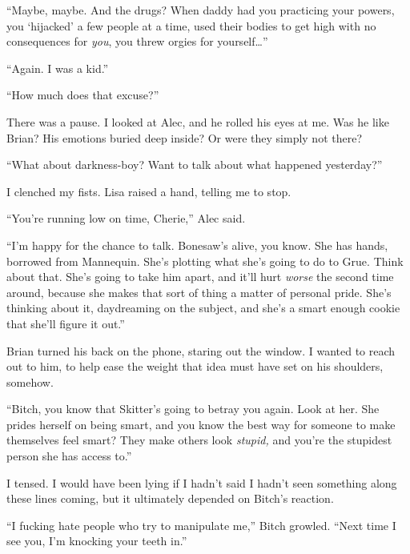 ``Maybe, maybe.  And the drugs?  When daddy had you practicing your powers, you `hijacked' a few people at a time, used their bodies to get high with no consequences for \emph{you}, you threw orgies for yourself\ldots''



``Again.  I was a kid.''



``How much does that excuse?''



There was a pause.  I looked at Alec, and he rolled his eyes at me.  Was he like Brian?  His emotions buried deep inside?  Or were they simply not there?



``What about darkness-boy?  Want to talk about what happened yesterday?''



I clenched my fists.  Lisa raised a hand, telling me to stop.



``You're running low on time, Cherie,'' Alec said.



``I'm happy for the chance to talk.  Bonesaw's alive, you know.  She has hands, borrowed from Mannequin.  She's plotting what she's going to do to Grue.  Think about that.  She's going to take him apart, and it'll hurt \emph{worse} the second time around, because she makes that sort of thing a matter of personal pride.  She's thinking about it, daydreaming on the subject, and she's a smart enough cookie that she'll figure it out.''



Brian turned his back on the phone, staring out the window.  I wanted to reach out to him, to help ease the weight that idea must have set on his shoulders, somehow.



``Bitch, you know that Skitter's going to betray you again.  Look at her.  She prides herself on being smart, and you know the best way for someone to make themselves feel smart? They make others look \emph{stupid, }and you're the stupidest person she has access to.''



I tensed.  I would have been lying if I hadn't said I hadn't seen something along these lines coming, but it ultimately depended on Bitch's reaction.



``I fucking hate people who try to manipulate me,'' Bitch growled.  ``Next time I see you, I'm knocking your teeth in.''



